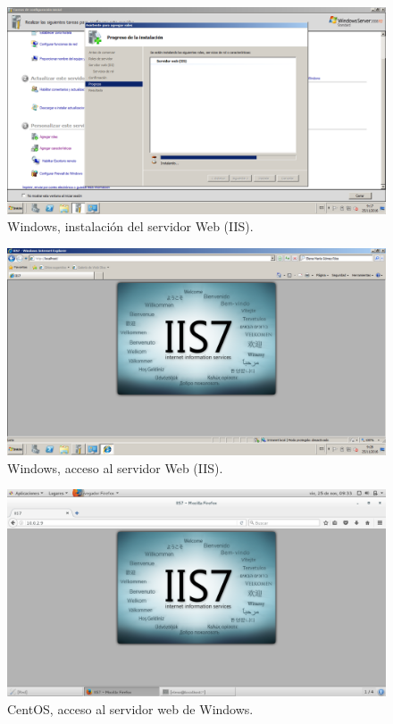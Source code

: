 \begin{figure}[H] 
	\centering
	\includegraphics[width=15cm]{./img/ejercicio10_3.png} 	
	\caption{Windows, instalación del servidor Web (IIS).} \label{fig:ejercicio10_3}
\end{figure}

\begin{figure}[H] 
	\centering
	\includegraphics[width=15cm]{./img/ejercicio10_4.png} 	
	\caption{Windows, acceso al servidor Web (IIS).} \label{fig:ejercicio10_4}
\end{figure}

\begin{figure}[H] 
	\centering
	\includegraphics[width=15cm]{./img/ejercicio10_5.png} 	
	\caption{CentOS, acceso al servidor web de Windows.} \label{fig:ejercicio10_5}
\end{figure}


